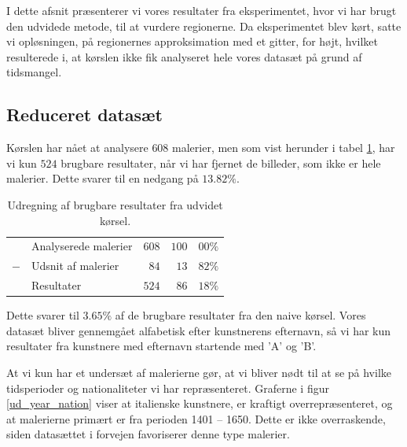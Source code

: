 {
{\sffamily I dette afsnit præsenterer vi vores resultater fra
eksperimentet, hvor vi har brugt den udvidede metode, til at vurdere
regionerne. Da eksperimentet blev kørt, satte vi opløsningen, på
regionernes approksimation med et gitter, for højt, hvilket resulterede
i, at kørslen ikke fik analyseret hele vores datasæt på grund af
tidsmangel.
}

\subsection{Reduceret datasæt}
Kørslen har nået at analysere $608$ malerier, men som vist herunder i
tabel \ref{ud_tabel_fjern_detaljer}, har vi kun $524$ brugbare
resultater, når vi har fjernet de billeder, som ikke er hele malerier.
Dette svarer til en nedgang på $13.82\%$.

\begin{table}[H]
    \centering
    \begin{tabular}{r@{\ \ }p{12em}r|r@{.}l}
            & Analyserede malerier & $608$ & $100$ & $00\%$   \\
        $-$ & Udsnit af malerier   &  $84$ &  $13$ & $82\%$   \\\hline
            & Resultater           & $524$ &  $86$ & $18\%$
    \end{tabular}
    \caption[]{Udregning af brugbare resultater fra udvidet kørsel.}
    \label{ud_tabel_fjern_detaljer}
\end{table}

Dette svarer til $3.65\%$ af de brugbare resultater fra den
naive kørsel. Vores datasæt bliver gennemgået alfabetisk efter
kunstnerens efternavn, så vi har kun resultater fra kunstnere med
efternavn startende med 'A' og 'B'.

At vi kun har et undersæt af malerierne gør, at vi bliver nødt til at se
på hvilke tidsperioder og nationaliteter vi har repræsenteret. Graferne
i figur \ref{ud_year_nation} viser at italienske kunstnere, er kraftigt
overrepræsenteret, og at malerierne primært er fra perioden 1401 --
1650. Dette er ikke overraskende, siden datasættet i forvejen
favoriserer denne type malerier.

}
